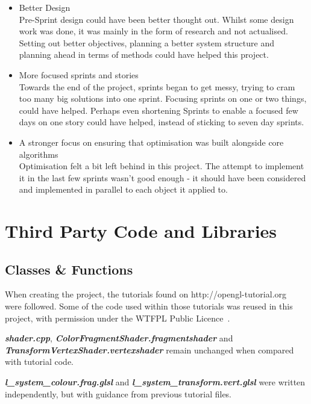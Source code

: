\documentclass[a4paper,10pt]{report}
\begin{document}
\begin{itemize}
    \item Better Design \\
    Pre-Sprint design could have been better thought out. Whilst some design work was done, it was mainly in the form of research and not actualised. Setting out better objectives, planning a better system structure and planning ahead in terms of methods could have helped this project.
    
    \item More focused sprints and stories\\
    Towards the end of the project, sprints began to get messy, trying to cram too many big solutions into one sprint. Focusing sprints on one or two things, could have helped. Perhaps even shortening Sprints to enable a focused few days on one story could have helped, instead of sticking to seven day sprints. 
    
    \item A stronger focus on ensuring that optimisation was built alongside core algorithms \\
    Optimisation felt a bit left behind in this project. The attempt to implement it in the last few sprints wasn't good enough - it should have been considered and implemented in parallel to each object it applied to. 
\end{itemize}
  
\clearpage

\appendix

\chapter{Third Party Code and Libraries}

\section{Classes \& Functions}

When creating the project, the tutorials found on http://opengl-tutorial.org~\cite{opengl_tutorial} were followed. Some of the code used within those tutorials was reused in this project, with permission under the WTFPL Public Licence~\cite{wtfpl}. \medskip

\textit{\textbf{shader.cpp}}, \textit{\textbf{ColorFragmentShader.fragmentshader}} and \textit{\textbf{TransformVertexShader.vertexshader}} remain unchanged when compared with tutorial code. \medskip

\textit{\textbf{l\_system\_colour.frag.glsl}} and \textit{\textbf{l\_system\_transform.vert.glsl}} were written independently, but with guidance from previous tutorial files.\medskip
\end{document}
